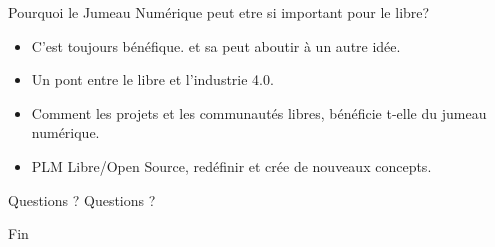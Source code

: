 \documentclass{beamer}
\begin{document}
 \begin{frame}{Pourquoi le Jumeau Numérique peut etre si important pour le libre?}
  \begin{itemize}
	\item C'est toujours bénéfique. et sa peut aboutir à un autre idée. 	
	\item Un pont entre le libre et l'industrie 4.0.
	\item Comment les projets et les communautés libres, bénéficie t-elle du jumeau numérique.
	\item PLM Libre/Open Source, redéfinir et crée de nouveaux concepts.
  \end{itemize}
 \end{frame}
 \begin{frame}{Questions ?}
 Questions ?
  \end{frame}
 \begin{frame}{Fin}
 \end{frame}
\end{document}
